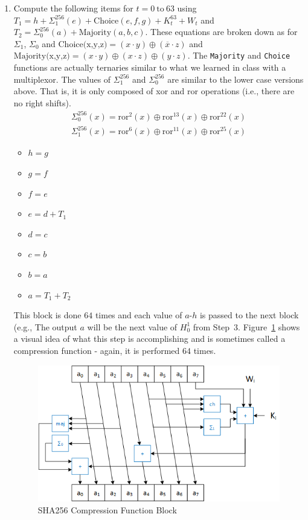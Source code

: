 \documentclass{article}
\begin{document}
\begin{enumerate}
    \item Compute the following items for $t = 0~\text{to}~63$ using      
      $T_1 = h + \Sigma_1^{256} (e) + \text{Choice}(e,f,g) + K_t^{63} + W_t$ and
      $T_2 = \Sigma_0^{256} (a) + \text{Majority}(a,b,c)$.  These 
      equations are broken down as for $\Sigma_1$, $\Sigma_0$
      and $\text{Choice(x,y,z)} = (x \cdot y) \oplus (\overline{x} \cdot z)$ and
      $\text{Majority(x,y,z)} = (x \cdot y) \oplus (x \cdot z) \oplus (y
      \cdot z)$.  The \verb!Majority! and \verb!Choice! functions are
      actually ternaries similar to what we learned in class with a
      multiplexor.
      The values of $\Sigma_1^{256}$ and $\Sigma_0^{256}$
      are similar to the lower case versions above.  That is, it
      is only composed of xor and ror operations (i.e., there are no right shifts).
      \begin{eqnarray*}
        \Sigma_0^{256}(x) = \text{ror}^{2}(x) \oplus \text{ror}^{13}(x) \oplus \text{ror}^{22}(x)    \\
        \Sigma_1^{256}(x) = \text{ror}^{6}(x) \oplus \text{ror}^{11}(x) \oplus \text{ror}^{25}(x)    
      \end{eqnarray*}
  \begin{itemize}
  \item $h = g$
  \item $g = f$
  \item $f = e$
  \item $e = d + T_1$
  \item $d = c$
  \item $c = b$
  \item $b = a$
  \item $a = T_1 + T_2$
  \end{itemize}
  This block is done $64$ times and each value of $a$-$h$ is passed to the
  next block (e.g., The output $a$ will be the next value of $H_0^1$
  from Step~$3$.  Figure~\ref{sha256compression.fig} shows a visual idea
  of what this step is accomplishing and is sometimes called a compression function
  - again, it is performed $64$ times.
  \begin{figure} [t!]
  \centering
  \includegraphics[scale=0.8]{sha256compression2.png}
  \caption{SHA256 Compression Function Block}
  \label{sha256compression.fig}
  \end{figure}
  

\end{enumerate}
\end{document}
